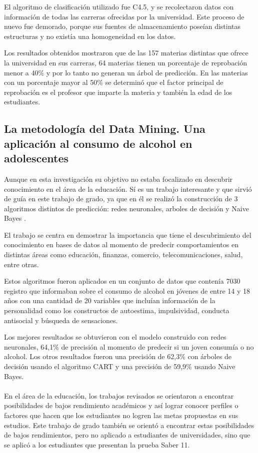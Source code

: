 El algoritmo de clasificación utilizado fue C4.5, y se recolectaron datos con información de todas las carreras ofrecidas por la universidad. Este proceso de nuevo fue demorado, porque sus fuentes de almacenamiento poseían distintas estructuras y no existía una homogeneidad en los datos.

Los resultados obtenidos mostraron que de las 157 materias distintas que ofrece la universidad en sus carreras, 64 materias tienen un porcentaje de reprobación menor a 40\% y por lo tanto no generan un árbol de predicción. En las materias con un porcentaje mayor al 50\% se determinó que el factor principal de reprobación es el profesor que imparte la materia y también la edad de los estudiantes.
\subsection{La metodología del Data Mining. Una aplicación al consumo de alcohol en adolescentes \cite{key-150}}
Aunque en esta investigación su objetivo no estaba focalizado en descubrir conocimiento en el área de la educación. Sí es un trabajo interesante y que sirvió de guía en este trabajo de grado, ya que en él se realizó la construcción de 3 algoritmos distintos de predicción: redes neuronales, arboles de decisión y Naive Bayes \cite{key-50}.

El trabajo se centra en demostrar la importancia que tiene el descubrimiento del conocimiento en bases de datos al momento de predecir comportamientos en distintas áreas como educación, finanzas, comercio, telecomunicaciones, salud, entre otras.

Estos algoritmos fueron aplicados en un conjunto de datos que contenía 7030 registro que informaban sobre el consumo de alcohol en jóvenes de entre 14 y 18 años con una cantidad de 20 variables que incluían información de la personalidad como los constructos de autoestima, impulsividad, conducta antisocial y búsqueda de sensaciones.

Los mejores resultados se obtuvieron con el modelo construido con redes neuronales, 64,1\% de precisión al momento de predecir si un joven consumía o no alcohol. Los otros resultados fueron una precisión de 62,3\% con árboles de decisión usando el algoritmo CART \cite{key-50} y una precisión de 59,9\% usando Naive Bayes.
\\
\\
En el área de la educación, los trabajos revisados se orientaron a encontrar posibilidades de bajos rendimiento académicos y así lograr conocer perfiles o factores que hacen que los estudiantes no logren las metas propuestas en sus estudios. Este trabajo de grado también se orientó a encontrar estas posibilidades de bajos rendimientos, pero no aplicado a estudiantes de universidades, sino que se aplicó a los estudiantes que presentan la prueba Saber 11\degree.

